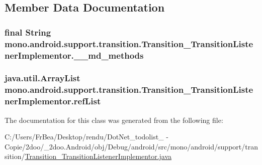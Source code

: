 \subsection{Member Data Documentation}
\hypertarget{classmono_1_1android_1_1support_1_1transition_1_1_transition___transition_listener_implementor_b6b0828df9171762b499bd4c4d860c22}{
\subsubsection[{\_\-\_\-md\_\-methods}]{\setlength{\rightskip}{0pt plus 5cm}final String {\bf mono.android.support.transition.Transition\_\-TransitionListenerImplementor.\_\-\_\-md\_\-methods}}}
\label{classmono_1_1android_1_1support_1_1transition_1_1_transition___transition_listener_implementor_b6b0828df9171762b499bd4c4d860c22}


\hypertarget{classmono_1_1android_1_1support_1_1transition_1_1_transition___transition_listener_implementor_662563a5cc609dd3b1dbc51ad2804725}{
\subsubsection[{refList}]{\setlength{\rightskip}{0pt plus 5cm}java.util.ArrayList {\bf mono.android.support.transition.Transition\_\-TransitionListenerImplementor.refList}}}
\label{classmono_1_1android_1_1support_1_1transition_1_1_transition___transition_listener_implementor_662563a5cc609dd3b1dbc51ad2804725}




The documentation for this class was generated from the following file:\begin{CompactItemize}
\item 
C:/Users/FrBea/Desktop/rendu/DotNet\_\-todolist\_ - Copie/2doo/\_\-2doo.Android/obj/Debug/android/src/mono/android/support/transition/\hyperlink{_transition___transition_listener_implementor_8java}{Transition\_\-TransitionListenerImplementor.java}\end{CompactItemize}
